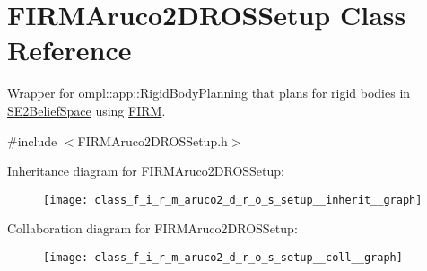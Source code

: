 \hypertarget{class_f_i_r_m_aruco2_d_r_o_s_setup}{\section{F\-I\-R\-M\-Aruco2\-D\-R\-O\-S\-Setup Class Reference}
\label{class_f_i_r_m_aruco2_d_r_o_s_setup}
}


Wrapper for ompl\-::app\-::\-Rigid\-Body\-Planning that plans for rigid bodies in \hyperlink{class_s_e2_belief_space}{S\-E2\-Belief\-Space} using \hyperlink{class_f_i_r_m}{F\-I\-R\-M}.  




{\ttfamily \#include $<$F\-I\-R\-M\-Aruco2\-D\-R\-O\-S\-Setup.\-h$>$}



Inheritance diagram for F\-I\-R\-M\-Aruco2\-D\-R\-O\-S\-Setup\-:\nopagebreak
\begin{figure}[H]
\begin{center}
\leavevmode
\texttt{[image: class\_f\_i\_r\_m\_aruco2\_d\_r\_o\_s\_setup\_\_inherit\_\_graph]}
\end{center}
\end{figure}


Collaboration diagram for F\-I\-R\-M\-Aruco2\-D\-R\-O\-S\-Setup\-:\nopagebreak
\begin{figure}[H]
\begin{center}
\leavevmode
\texttt{[image: class\_f\_i\_r\_m\_aruco2\_d\_r\_o\_s\_setup\_\_coll\_\_graph]}
\end{center}
\end{figure}

